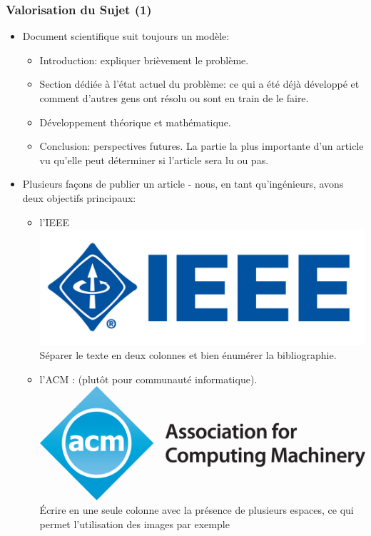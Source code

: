 \documentclass[10pt]{beamer}
\begin{document}
\begin{frame}
\frametitle{Valorisation du Sujet (1)}

\begin{itemize}

\item Document scientifique suit toujours un modèle: 
 
\begin{itemize}
  \item Introduction: expliquer brièvement le problème.
  \item Section dédiée à l'état actuel du problème: ce qui a été déjà
  développé et comment d'autres gens ont résolu ou sont en train de le faire. 
  \item Développement théorique et mathématique.
  \item Conclusion: perspectives futures. La partie la plus  importante d'un
  article vu qu'elle peut déterminer si l'article sera lu ou pas.

\end{itemize}

\item Plusieurs façons de publier un article - nous, en tant
qu'ingénieurs, avons deux objectifs principaux:

\begin{itemize} 
  \item l'IEEE \hspace{6cm}  \includegraphics[scale=0.025]{images/IEEE_logo} \\
  		Séparer le texte en deux colonnes et bien énumérer la bibliographie. 
  \item l'ACM : (plutôt pour communauté informatique). \hspace{1pt}
  \includegraphics[scale=0.2]{images/acm}\\
  		Écrire en une seule colonne avec la présence
de plusieurs espaces, ce qui permet l'utilisation des images par exemple

\end{itemize}

\end{itemize}

\end{frame}
\end{document}
